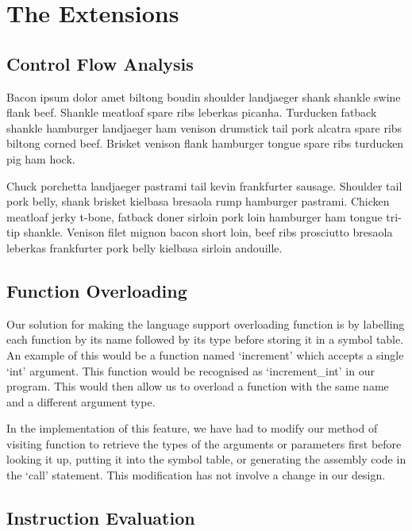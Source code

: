 \documentclass[11pt]{article}
\begin{document}
\section{The Extensions}

\subsection{Control Flow Analysis}

Bacon ipsum dolor amet biltong boudin shoulder landjaeger shank shankle swine flank beef. Shankle meatloaf spare ribs leberkas picanha. Turducken fatback shankle hamburger landjaeger ham venison drumstick tail pork alcatra spare ribs biltong corned beef. Brisket venison flank hamburger tongue spare ribs turducken pig ham hock.

\medskip

Chuck porchetta landjaeger pastrami tail kevin frankfurter sausage. Shoulder tail pork belly, shank brisket kielbasa bresaola rump hamburger pastrami. Chicken meatloaf jerky t-bone, fatback doner sirloin pork loin hamburger ham tongue tri-tip shankle. Venison filet mignon bacon short loin, beef ribs prosciutto bresaola leberkas frankfurter pork belly kielbasa sirloin andouille.

\subsection{Function Overloading}

Our solution for making the language support overloading function is by labelling each function by its name followed by its type before storing it in a symbol table. An example of this would be a function named ‘increment’ which accepts a single ‘int’ argument. This function would be recognised as ‘increment\_int’ in our program. This would then allow us to overload a function with the same name and a different argument type.

\medskip 

In the implementation of this feature, we have had to modify our method of visiting function to retrieve the types of the arguments or parameters first before looking it up, putting it into the symbol table, or generating the assembly code in the ‘call’ statement. This modification has not involve a change in our design.

\subsection{Instruction Evaluation}
\end{document}
